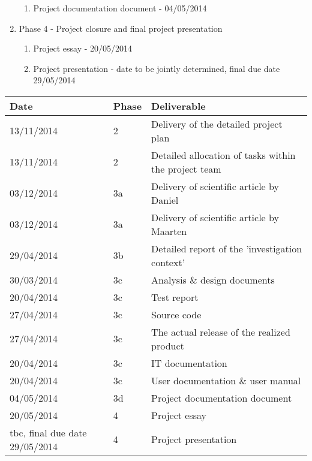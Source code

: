 \begin{enumerate}
 	\begin{enumerate}
		\item Project documentation document				- 	04/05/2014
	\end {enumerate}
	\item Phase 4 - Project closure and final project presentation
 	\begin{enumerate}
		\item Project essay							- 	20/05/2014
		\item Project presentation						- 	date to be jointly determined, final due date 29/05/2014
	\end {enumerate}
\end {enumerate}

\begin{center}
    \begin{tabular}{ | l | l |  p{7cm} |}
    \hline
    	Date & Phase & Deliverable \\ 
    \hline
    	13/11/2014 & 2 & Delivery of the detailed project plan \\ 
    \hline
    	13/11/2014 & 2 & Detailed allocation of tasks within the project team \\ 
    \hline
    	03/12/2014 & 3a & Delivery of scientific article by Daniel\\ 
    \hline
    	03/12/2014 & 3a & Delivery of scientific article by Maarten \\ 
    \hline
    	29/04/2014 & 3b & Detailed report of the 'investigation context'  \\ 
    \hline
  	 30/03/2014 & 3c & Analysis \& design documents \\ 
    \hline
   	20/04/2014 & 3c & Test report \\ 
    \hline
  	27/04/2014 & 3c & Source code \\ 
    \hline
  	27/04/2014 & 3c & The actual release of the realized product \\ 
    \hline
  	20/04/2014 & 3c &  IT documentation   \\ 
    \hline
  	20/04/2014 & 3c & User documentation \& user manual  \\ 
    \hline
  	04/05/2014 & 3d & Project documentation document \\ 
    \hline
  	20/05/2014 & 4 & Project essay \\ 
    \hline
 	tbc, final due date 29/05/2014 & 4 & Project presentation	 \\ 
    \hline
    \end{tabular}
\end{center}

